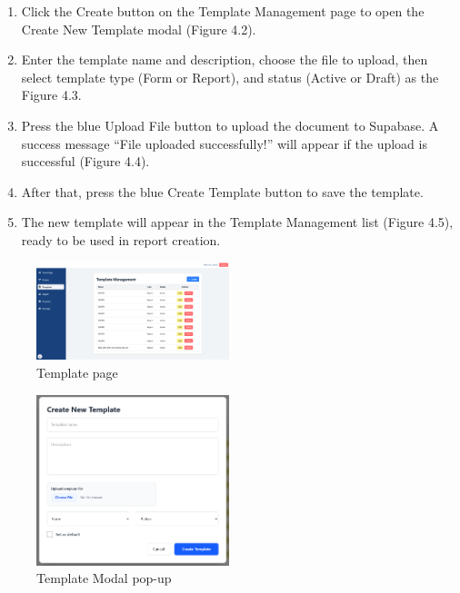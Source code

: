 \begin{enumerate}
    \item Click the Create button on the Template Management page to open the Create New Template modal (Figure 4.2).  
    \item Enter the template name and description, choose the file to upload, then select template type (Form or Report), and status (Active or Draft) as the Figure 4.3.
    \item Press the blue Upload File button to upload the document to Supabase. A success message “File uploaded successfully!” will appear if the upload is successful (Figure 4.4).
    \item After that, press the blue Create Template button to save the template.
    \item The new template will appear in the Template Management list (Figure 4.5), ready to be used in report creation.
    
\end{enumerate}
\begin{figure}[h]
\centering
    \includegraphics[width=0.5\textwidth]{images/template_page.png}
    \caption{Template page} 
    \label{fig:template}
\end{figure}
\begin{figure}[h]
\centering
    \includegraphics[width=0.5\textwidth]{images/template_modal.png}
    \caption{Template Modal pop-up} 
    \label{fig:template_modal}
\end{figure}

